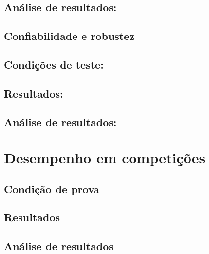 \subsection*{\textbf{Análise de resultados:}}


\subsection{Confiabilidade e robustez}

\subsection*{\textbf{Condições de teste:}}

\subsection*{\textbf{Resultados:}}  

\subsection*{\textbf{Análise de resultados:}}


\section{\textbf{Desempenho em competições}}

\subsection{Condição de prova}

\subsection{Resultados}

\subsection{Análise de resultados}